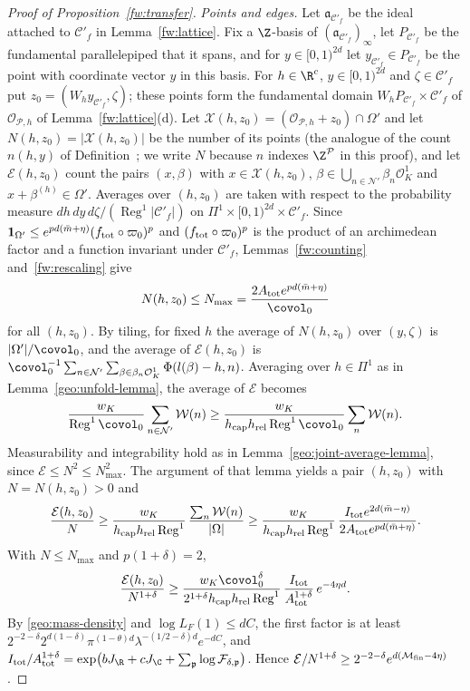 \begin{proof}[Proof of Proposition~\ref{fw:transfer}]
\emph{Points and edges.} Let $\mathfrak a_{\mathcal C'_f}$ be the ideal attached to
$\mathcal C'_f$ in Lemma~\ref{fw:lattice}. Fix a $\Z$-basis of
$(\mathfrak a_{\mathcal C'_f})_\infty$, let $P_{\mathcal C'_f}$ be the fundamental
parallelepiped that it spans, and for $y\in[0,1)^{2d}$ let
$y_{\mathcal C'_f}\in P_{\mathcal C'_f}$ be the point with coordinate
vector $y$ in this basis. For $h\in\R^c$, $y\in[0,1)^{2d}$ and
$\zeta\in\mathcal C'_f$ put $z_0=(W_hy_{\mathcal C'_f},\zeta)$; these
points form the fundamental domain $W_hP_{\mathcal C'_f}\times\mathcal
C'_f$ of $\mathcal O_{\mathcal P,h}$ of Lemma~\ref{fw:lattice}(d). Let
$\mathcal X(h,z_0)=(\mathcal O_{\mathcal P,h}+z_0)\cap\Omega'$ and let
$N(h,z_0)=|\mathcal X(h,z_0)|$ be the number of its points (the analogue
of the count $n(h,y)$ of Definition~; we write $N$ because $n$
indexes $\Z^{\mathcal P}$ in this proof), and let
$\mathcal E(h,z_0)$ count the pairs $(x,\beta)$ with
$x\in\mathcal X(h,z_0)$, $\beta\in\bigcup_{n\in\mathcal N'}\beta_n\mathcal
O_K^1$ and $x+\beta^{(h)}\in\Omega'$. Averages over $(h,z_0)$ are taken
with respect to the probability measure
$dh\,dy\,d\zeta/(\operatorname{Reg}^1|\mathcal C'_f|)$ on
$\Pi^1\times[0,1)^{2d}\times\mathcal C'_f$. Since
$\mathbf 1_{\Omega'}\le e^{pd(\bar m+\eta)}(f_{\rm tot}\circ\varpi_0)^p$ and
$(f_{\rm tot}\circ\varpi_0)^p$ is the product of an archimedean factor and a
function invariant under $\mathcal C'_f$, Lemmas~\ref{fw:counting}
and~\ref{fw:rescaling} give
\[
 N(h,z_0)\le N_{\max}=\frac{2A_{\rm tot}e^{pd(\bar m+\eta)}}{\covol_0}
\]
for all $(h,z_0)$. By tiling, for fixed $h$ the average of $N(h,z_0)$
over $(y,\zeta)$ is $|\Omega'|/\covol_0$, and the average of
$\mathcal E(h,z_0)$ is
$\covol_0^{-1}\sum_{n\in\mathcal N'}\sum_{\beta\in\beta_n\mathcal O_K^1}
\Phi(l(\beta)-h,n)$. Averaging over $h\in\Pi^1$ as in
Lemma~\ref{geo:unfold-lemma}, the average of $\mathcal E$ becomes
\[
 \frac{w_K}{\operatorname{Reg}^1\covol_0}\sum_{n\in\mathcal N'}\mathcal W(n)
 \ge\frac{w_K}{h_{\rm cap}h_{\rm rel}\operatorname{Reg}^1\covol_0}
 \sum_n\mathcal W(n).
\]
Measurability and integrability hold as in
Lemma~\ref{geo:joint-average-lemma}, since $\mathcal E\le N^2\le
N_{\max}^2$. The argument of that lemma yields a pair $(h,z_0)$ with
$N=N(h,z_0)>0$ and
\[
 \frac{\mathcal E(h,z_0)}N\ge\frac{w_K}{h_{\rm cap}h_{\rm rel}
 \operatorname{Reg}^1}\,\frac{\sum_n\mathcal W(n)}{|\Omega|}
 \ge\frac{w_K}{h_{\rm cap}h_{\rm rel}\operatorname{Reg}^1}\,
 \frac{I_{\rm tot}e^{2d(\bar m-\eta)}}{2A_{\rm tot}e^{pd(\bar m+\eta)}} .
\]
With $N\le N_{\max}$ and $p(1+\delta)=2$,
\[
 \frac{\mathcal E(h,z_0)}{N^{1+\delta}}\ge
 \frac{w_K\covol_0^\delta}{2^{1+\delta}h_{\rm cap}h_{\rm rel}
 \operatorname{Reg}^1}\,\frac{I_{\rm tot}}{A_{\rm tot}^{1+\delta}}\,e^{-4\eta d}.
\]
By \eqref{geo:mass-density} and $\log L_F(1)\le dC$, the first factor
is at least
$2^{-2-\delta}2^{d(1-\delta)}\pi^{(1-\theta)d}\lambda^{-(1/2-\delta)d}e^{-dC}$,
and $I_{\rm tot}/A_{\rm tot}^{1+\delta}=\exp\bigl(bJ_\R+cJ_\C+\sum_{\mathfrak p}\log\mathcal
F_{\delta,\mathfrak p}\bigr)$. Hence
$\mathcal E/N^{1+\delta}\ge2^{-2-\delta}e^{d(\mathcal M_{\rm
fin}-4\eta)}$.


\end{proof}
